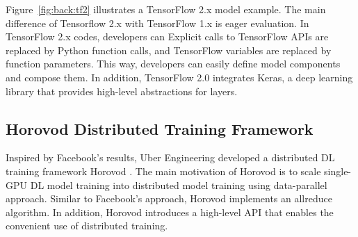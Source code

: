 Figure~\ref{fig:back:tf2} illustrates a TensorFlow 2.x model example.
The main difference of Tensorflow 2.x with TensorFlow 1.x is eager evaluation.
In TensorFlow 2.x codes, developers can 
Explicit calls to TensorFlow APIs are replaced by Python function calls,
and TensorFlow variables are replaced by function parameters.
This way, developers can easily define model components and compose them. 
In addition, TensorFlow 2.0 integrates Keras\cite{keras},
a deep learning library that provides high-level abstractions for layers.

\subsection{Horovod Distributed Training Framework}

% 
Inspired by Facebook's results, Uber Engineering developed a distributed DL
training framework Horovod \cite{sergeev2018horovod}. 
The main motivation of Horovod is to scale single-GPU DL model training
into distributed model training using data-parallel approach. 
Similar to Facebook's approach, Horovod implements an allreduce algorithm. 
In addition, Horovod introduces a high-level API that enables
the convenient use of distributed training.  
